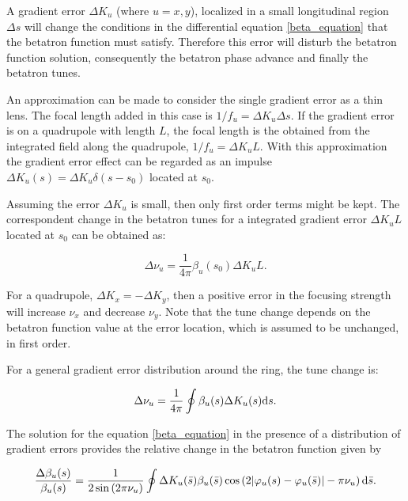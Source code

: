 A gradient error $\Delta K_u$ (where $u=x, y$), localized in a small longitudinal region $\Delta s$ will change the conditions in the differential equation \eqref{beta_equation} that the betatron function must satisfy. Therefore this error will disturb the betatron function solution, consequently the betatron phase advance and finally the betatron tunes.

An approximation can be made to consider the single gradient error as a thin lens. The focal length added in this case is $1/f_u = \Delta K_u \Delta s$. If the gradient error is on a quadrupole with length $L$, the focal length is the obtained from the integrated field along the quadrupole, $1/f_u = \Delta K_u L$. With this approximation the gradient error effect can be regarded as an impulse $\Delta K_u(s) = \Delta K_u \delta(s-s_0)$ located at $s_0$.

Assuming the error $\Delta K_u$ is small, then only first order terms might be kept. The correspondent change in the betatron tunes for a integrated gradient error $\Delta K_u L$ located at $s_0$ can be obtained as:

\begin{equation}
    \Delta \nu_u = \dfrac{1}{4 \pi} \beta_u (s_0) \Delta K_u L.
\end{equation}

For a quadrupole, $\Delta K_x = - \Delta K_y$, then a positive error in the focusing strength will increase $\nu_x$ and decrease $\nu_y$. Note that the tune change depends on the betatron function value at the error location, which is assumed to be unchanged, in first order.

For a general gradient error distribution around the ring, the tune change is:

\begin{equation}
    \Delta \nu_u = \dfrac{1}{4 \pi} \oint \beta_u ({s}) \Delta K_u ({s})\mathrm{d} {s}.
\end{equation}

The solution for the equation \eqref{beta_equation} in the presence of a distribution of gradient errors provides the relative change in the betatron function given by

\begin{equation}
    \dfrac{\Delta \beta_u(s)}{\beta_u(s)} = \dfrac{1}{2\sin\left(2\pi \nu_u\right)} \oint \Delta K_u(\bar{s}) \beta_u(\bar{s}) \cos\left(2|\varphi_{u}(s) - \varphi_{u}(\bar{s})| - \pi\nu_{u} \right) \mathrm{d} \bar{s}.
\end{equation}

